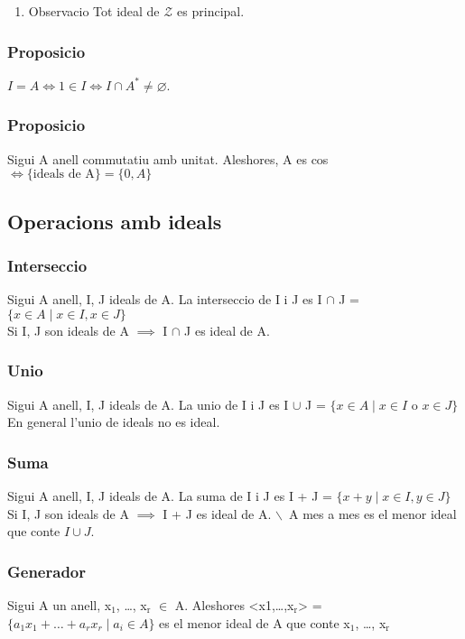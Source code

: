 \documentclass[11pt]{article}
\begin{document}
\begin{enumerate}
\item Observacio
\label{sec:orgb5e4624}
Tot ideal de \(\mathcal{Z}\) es principal.
\end{enumerate}

\subsubsection{Proposicio}
\label{sec:org5ccdd46}
\(I = A \iff 1 \in I \iff I \cap A^* \neq \varnothing\).

\subsubsection{Proposicio}
\label{sec:orgd84559d}
Sigui A anell commutatiu amb unitat. Aleshores, A es cos \(\iff \{\text{ideals de A}\} = \{0,A\}\)

\subsection{Operacions amb ideals}
\label{sec:org95d1c92}

\subsubsection{Interseccio}
\label{sec:orgb9ecdde}
Sigui A anell, I, J ideals de A.
La interseccio de I i J es I \(\cap\) J = \(\{ x \in A \mid x \in I, x \in J\}\) \\
Si I, J son ideals de A \(\implies\) I \(\cap\) J es ideal de A.

\subsubsection{Unio}
\label{sec:org9bff67d}
Sigui A anell, I, J ideals de A.
La unio de I i J es I \(\cup\) J = \(\{ x \in A \mid x \in I \text{ o } x \in J\}\) \\
En general l'unio de ideals no es ideal.

\subsubsection{Suma}
\label{sec:org7031c6f}
Sigui A anell, I, J ideals de A.
La suma de I i J es I + J = \(\{ x + y \mid x \in I, y \in J\}\) \\
Si I, J son ideals de A \(\implies\) I + J es ideal de A. $\backslash$\ A mes a mes es el menor ideal que conte \(I \cup J\).

\subsubsection{Generador}
\label{sec:org92bda1f}
Sigui A un anell, x\(_{\text{1}}\), \dots{}, x\(_{\text{r}}\) \(\in\) A. Aleshores <x1,\dots{},x\(_{\text{r}}\)> = \(\{ a_{1}x_{1} + \dots + a_{r}x_{r} \mid a_i \in A \}\) es el menor ideal de A que conte  x\(_{\text{1}}\), \dots{}, x\(_{\text{r}}\)
\end{document}
